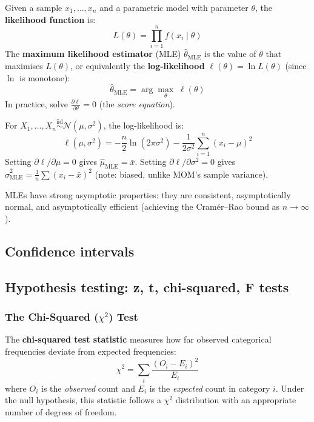 \begin{definition}
Given a sample $x_1, \ldots, x_n$ and a parametric model with parameter $\theta$, the \textbf{likelihood function} is:
\[
L(\theta) = \prod_{i=1}^n f(x_i \mid \theta)
\]
The \textbf{maximum likelihood estimator} (MLE) $\hat{\theta}_{\mathrm{MLE}}$ is the value of $\theta$ that maximises $L(\theta)$, or equivalently the \textbf{log-likelihood} $\ell(\theta) = \ln L(\theta)$ (since $\ln$ is monotone):
\[
\hat{\theta}_{\mathrm{MLE}} = \arg\max_{\theta}\; \ell(\theta)
\]
In practice, solve $\frac{\partial \ell}{\partial \theta} = 0$ (the \emph{score equation}).
\end{definition}

\begin{example}
For $X_1,\ldots,X_n \overset{\text{iid}}{\sim} \mathcal{N}(\mu, \sigma^2)$, the log-likelihood is:
\[
\ell(\mu, \sigma^2) = -\frac{n}{2}\ln(2\pi\sigma^2) - \frac{1}{2\sigma^2}\sum_{i=1}^n (x_i - \mu)^2
\]
Setting $\partial\ell/\partial\mu = 0$ gives $\hat{\mu}_{\mathrm{MLE}} = \bar{x}$. Setting $\partial\ell/\partial\sigma^2 = 0$ gives $\hat{\sigma}^2_{\mathrm{MLE}} = \frac{1}{n}\sum(x_i-\bar{x})^2$ (note: biased, unlike MOM's sample variance).
\end{example}

\begin{remark}
MLEs have strong asymptotic properties: they are consistent, asymptotically normal, and asymptotically efficient (achieving the Cramér--Rao bound as $n \to \infty$).
\end{remark}

\subsection{Confidence intervals}


\subsection{Hypothesis testing: z, t, chi-squared, F tests}

\subsubsection*{The Chi-Squared ($\chi^2$) Test}

\begin{definition}
The \textbf{chi-squared test statistic} measures how far observed categorical frequencies deviate from expected frequencies:
\[
\chi^2 = \sum_{i} \frac{(O_i - E_i)^2}{E_i}
\]
where $O_i$ is the \emph{observed} count and $E_i$ is the \emph{expected} count in category $i$. Under the null hypothesis, this statistic follows a $\chi^2$ distribution with an appropriate number of degrees of freedom.
\end{definition}

